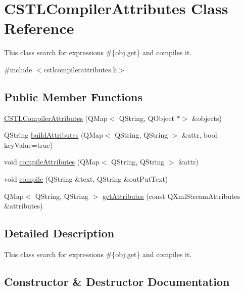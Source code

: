 \hypertarget{class_c_s_t_l_compiler_attributes}{}\section{C\+S\+T\+L\+Compiler\+Attributes Class Reference}
\label{class_c_s_t_l_compiler_attributes}


This class search for expressions \#\{obj.\+get\} and compiles it.  




{\ttfamily \#include $<$cstlcompilerattributes.\+h$>$}

\subsection*{Public Member Functions}
\begin{DoxyCompactItemize}
\item 
\hyperlink{class_c_s_t_l_compiler_attributes_a1c632f803e86b254d3997a670ab8d185}{C\+S\+T\+L\+Compiler\+Attributes} (Q\+Map$<$ Q\+String, Q\+Object $\ast$$>$ \&objects)
\item 
Q\+String \hyperlink{class_c_s_t_l_compiler_attributes_a68ca7d9d8ef45dd5f51a0977fb8df911}{build\+Attributes} (Q\+Map$<$ Q\+String, Q\+String $>$ \&attr, bool key\+Value=true)
\item 
void \hyperlink{class_c_s_t_l_compiler_attributes_a1376447033a4bfcceb1b1d27935d6d06}{compile\+Attributes} (Q\+Map$<$ Q\+String, Q\+String $>$ \&attr)
\item 
void \hyperlink{class_c_s_t_l_compiler_attributes_a63a271e6d97a614a02cd692c8a1f6395}{compile} (Q\+String \&text, Q\+String \&out\+Put\+Text)
\item 
Q\+Map$<$ Q\+String, Q\+String $>$ \hyperlink{class_c_s_t_l_compiler_attributes_aaccef26836cdd8e2c7974b1a1e70b6c0}{get\+Attributes} (const Q\+Xml\+Stream\+Attributes \&attributes)
\end{DoxyCompactItemize}


\subsection{Detailed Description}
This class search for expressions \#\{obj.\+get\} and compiles it. 

\subsection{Constructor \& Destructor Documentation}
\mbox{\label{class_c_s_t_l_compiler_attributes_a1c632f803e86b254d3997a670ab8d185}} 
